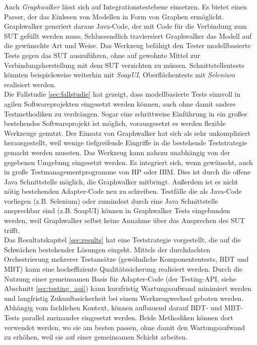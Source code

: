 Auch \textit{Graphwalker} lässt sich auf Integrationstestebene einsetzen. Es bietet einen Parser, der das Einlesen von Modellen in Form von Graphen ermöglicht. Graphwalker generiert daraus Java-Code, der mit Code für die Verbindung zum \Gls{SUT} gefüllt werden muss. Schlussendlich traviersiert Graphwalker das Modell auf die gewünschte Art und Weise. Das Werkzeug befähigt den Tester modellbasierte Tests gegen das \Gls{SUT} auszuführen, ohne auf gewohnte Mittel zur Verbindungsherstellung mit dem \Gls{SUT} verzichten zu müssen. Schnittstellentests könnten beispielsweise weiterhin mit \textit{SoapUI}, Oberflächentests mit \textit{Selenium} realisiert werden.\\
Die Fallstudie \ref{sec:fallstudie} hat gezeigt, dass modellbasierte Tests sinnvoll in agilen Softwareprojekten eingesetzt werden können, auch ohne damit andere Testmethodiken zu verdrängen. Sogar eine schrittweise Einführung in ein großes bestehendes Softwareprojekt ist möglich, vorausgesetzt es werden flexible Werkzeuge genutzt. Der Einsatz von Graphwalker hat sich als sehr unkompliziert herausgestellt, weil wenige tiefgreifende Eingriffe in die bestehende Teststrategie gemacht werden mussten. Das Werkzeug kann nahezu unabhängig von der gegebenen Umgebung eingesetzt werden. Es integriert sich, wenn gewünscht, auch in große Testmanagementprogramme von HP oder IBM. Dies ist durch die offene Java Schnittstelle möglich, die Graphwalker mitbringt. Außerdem ist es nicht nötig bestehenden Adapter-Code neu zu schreiben. Testfälle die als Java-Code vorliegen (z.B. Selenium) oder zumindest durch eine Java Schnittstelle ansprechbar sind (z.B. SoapUI) können in Graphwalker Tests eingebunden werden, weil Graphwalker selbst keine Annahme über das Ansprechen des \Gls{SUT} trifft.\\

Das Resultatskapitel \ref{sec:results} hat eine Teststrategie vorgestellt, die auf die Schwächen bestehender Lösungen eingeht. Mittels der durchdachten Orchestrierung mehrerer Testansätze (gewöhnliche Komponententests, \Gls{BDT} und \Gls{MBT}) kann eine hocheffiziente Qualitätssicherung realisiert werden. Durch die Nutzung einer gemeinsamen Basis für Adapter-Code (der Testing-API, siehe Abschnitt \ref{sec:testing_api}) kann kurzfristig Wartungsaufwand minimiert werden und langfristig Zukunftssicherheit bei einem Werkzeugwechsel geboten werden. 
Abhängig vom fachlichen Kontext, können aufbauend darauf \Gls{BDT}- und \Gls{MBT}-Tests parallel zueinander eingesetzt werden. Beide Methodiken können dort verwendet werden, wo sie am besten passen, ohne damit den Wartungsaufwand zu erhöhen, weil sie auf einer gemeinsamen Schicht arbeiten.\\

